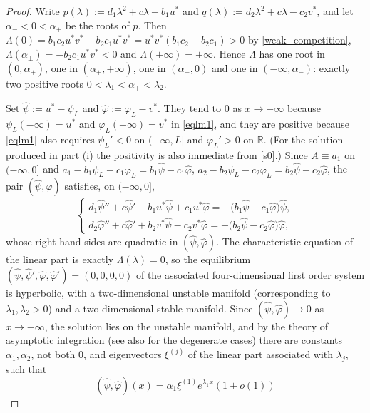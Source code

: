 \documentclass[reqno]{amsart}
\theoremstyle{plain}
\theoremstyle{definition}
\theoremstyle{remark}
\begin{document}
\begin{proof}
	Write $p(\lambda):=d_1\lambda^2+c\lambda-b_1u^*$ and
	$q(\lambda):=d_2\lambda^2+c\lambda-c_2v^*$, and let
	$\alpha_-<0<\alpha_+$ be the roots of $p$. Then
	$\Lambda(0)=b_1c_2u^*v^*-b_2c_1u^*v^*=u^*v^*(b_1c_2-b_2c_1)>0$ by
	\eqref{weak_competition}, $\Lambda(\alpha_\pm)=-b_2c_1u^*v^*<0$ and
	$\Lambda(\pm\infty)=+\infty$. Hence $\Lambda$ has one root in
	$(0,\alpha_+)$, one in $(\alpha_+,+\infty)$, one in $(\alpha_-,0)$ and one in
	$(-\infty,\alpha_-)$: exactly two positive roots
	$0<\lambda_1<\alpha_+<\lambda_2$.

	Set $\hat\psi:=u^*-\psi_L$ and $\hat\varphi:=\varphi_L-v^*$. They tend
	to $0$ as $x\to-\infty$ because $\psi_L(-\infty)=u^*$ and
	$\varphi_L(-\infty)=v^*$ in \eqref{eqlm1}, and they are positive because
	\eqref{eqlm1} also requires $\psi_L'<0$ on $(-\infty,L]$ and
	$\varphi_L'>0$ on $\mathbb{R}$. \textup{(}For the solution produced in
	part \textup{(i)} the positivity is also immediate from \eqref{s0}.\textup{)} Since
	$A\equiv a_1$ on $(-\infty,0]$ and
	$a_1-b_1\psi_L-c_1\varphi_L=b_1\hat\psi-c_1\hat\varphi$,
	$a_2-b_2\psi_L-c_2\varphi_L=b_2\hat\psi-c_2\hat\varphi$, the pair
	$(\hat\psi,\hat\varphi)$ satisfies, on $(-\infty,0]$,
	\begin{equation}\label{lin}
		\begin{cases}
			d_1\hat\psi''+c\hat\psi'-b_1u^*\hat\psi+c_1u^*\hat\varphi
			=-\big(b_1\hat\psi-c_1\hat\varphi\big)\hat\psi ,\\[2pt]
			d_2\hat\varphi''+c\hat\varphi'+b_2v^*\hat\psi-c_2v^*\hat\varphi
			=-\big(b_2\hat\psi-c_2\hat\varphi\big)\hat\varphi ,
		\end{cases}
	\end{equation}
	whose right hand sides are quadratic in $(\hat\psi,\hat\varphi)$. The
	characteristic equation of the linear part is exactly $\Lambda(\lambda)=0$, so
	the equilibrium $(\hat\psi,\hat\psi',\hat\varphi,\hat\varphi')=(0,0,0,0)$ of
	the associated four-dimensional first order system is hyperbolic, with a
	two-dimensional unstable manifold (corresponding to $\lambda_1,\lambda_2>0$)
	and a two-dimensional stable manifold. Since $(\hat\psi,\hat\varphi)\to0$ as
	$x\to-\infty$, the solution lies on the unstable manifold, and by the theory
	of asymptotic integration \cite[Chapter 3, Theorem 8.1]{MR69338} (see also
	\cite{MR658490} for the degenerate cases) there are constants
	$\alpha_1,\alpha_2$, not both $0$, and eigenvectors $\xi^{(j)}$ of the linear
	part associated with $\lambda_j$, such that
	\[
	(\hat\psi,\hat\varphi)(x)=\alpha_1\xi^{(1)}e^{\lambda_1x}(1+o(1))
\]
\end{proof}
\end{document}
